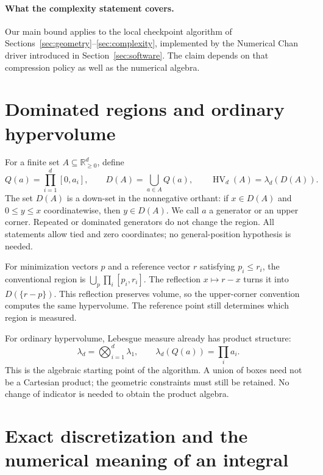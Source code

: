 \documentclass[12pt,a4paper]{article}
\theoremstyle{definition}
\newcommand{\HV}{\operatorname{HV}}
\newcommand{\R}{\mathbb R}
\begin{document}
\paragraph{What the complexity statement covers.}
Our main bound applies to the local checkpoint algorithm of
Sections~\ref{sec:geometry}--\ref{sec:complexity}, implemented by the
Numerical Chan driver introduced in Section~\ref{sec:software}. The
claim depends on that compression policy as well as the numerical algebra.

\section{Dominated regions and ordinary hypervolume}
\label{sec:product}

For a finite set $A\subseteq\R_{\ge0}^d$, define
\[
 Q(a)=\prod_{i=1}^d[0,a_i],\qquad
 D(A)=\bigcup_{a\in A}Q(a),\qquad
 \HV_d(A)=\lambda_d(D(A)).
\]
The set $D(A)$ is a down-set in the nonnegative orthant: if $x\in D(A)$
and $0\le y\le x$ coordinatewise, then $y\in D(A)$.
We call $a$ a generator or an upper corner. Repeated or dominated
generators do not change the region. All statements allow tied and zero
coordinates; no general-position hypothesis is needed.

For minimization vectors $p$ and a reference vector $r$ satisfying
$p_i\le r_i$, the conventional region is
$\bigcup_p\prod_i[p_i,r_i]$. The reflection $x\mapsto r-x$ turns it into
$D(\{r-p\})$. This reflection preserves volume, so the upper-corner
convention computes the same hypervolume. The reference point still
determines which region is measured.

For ordinary hypervolume, Lebesgue measure already has product structure:
\[
 \lambda_d=\bigotimes_{i=1}^d\lambda_1,
 \qquad \lambda_d(Q(a))=\prod_i a_i.
\]
This is the algebraic starting point of the algorithm. A union of boxes
need not be a Cartesian product; the geometric constraints must still be
retained. No change of indicator is needed to obtain the product algebra.

\section{Exact discretization and the numerical meaning of an integral}
\label{sec:discrete}
\end{document}
